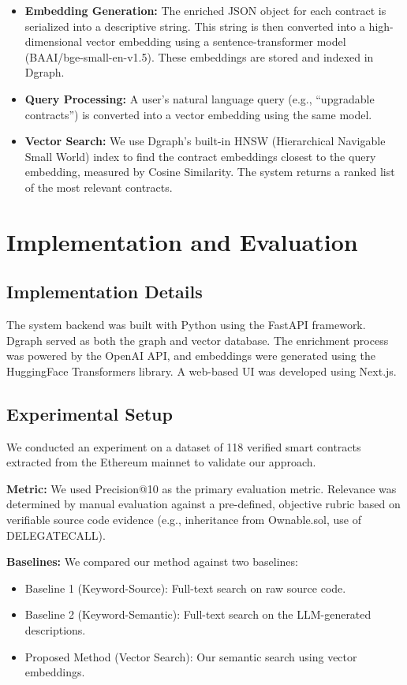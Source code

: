 \begin{itemize}
	\item \textbf{Embedding Generation:} The enriched JSON object for each contract is serialized into a descriptive string. This string is then converted into a high-dimensional vector embedding using a sentence-transformer model (BAAI/bge-small-en-v1.5). These embeddings are stored and indexed in Dgraph.
	\item \textbf{Query Processing:} A user's natural language query (e.g., ``upgradable contracts'') is converted into a vector embedding using the same model.
	\item \textbf{Vector Search:} We use Dgraph's built-in HNSW (Hierarchical Navigable Small World) index to find the contract embeddings closest to the query embedding, measured by Cosine Similarity. The system returns a ranked list of the most relevant contracts.
\end{itemize}

\section{Implementation and Evaluation}\label{sec:implementation}

\subsection{Implementation Details}
The system backend was built with Python using the FastAPI framework. Dgraph served as both the graph and vector database. The enrichment process was powered by the OpenAI API, and embeddings were generated using the HuggingFace Transformers library. A web-based UI was developed using Next.js.

\subsection{Experimental Setup}
We conducted an experiment on a dataset of 118 verified smart contracts extracted from the Ethereum mainnet to validate our approach.

\textbf{Metric:} We used Precision@10 as the primary evaluation metric. Relevance was determined by manual evaluation against a pre-defined, objective rubric based on verifiable source code evidence (e.g., inheritance from Ownable.sol, use of DELEGATECALL).

\textbf{Baselines:} We compared our method against two baselines:
\begin{itemize}
	\item Baseline 1 (Keyword-Source): Full-text search on raw source code.
	\item Baseline 2 (Keyword-Semantic): Full-text search on the LLM-generated descriptions.
	\item Proposed Method (Vector Search): Our semantic search using vector embeddings.
\end{itemize}

